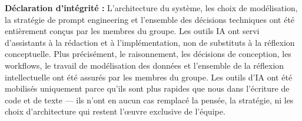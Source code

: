 \documentclass[12pt, a4paper, oneside]{report}
\begin{document}
\begin{successbox}
  \textbf{Déclaration d'intégrité :} L'architecture du système, les choix de
  modélisation, la stratégie de prompt engineering et l'ensemble des décisions
  techniques ont été entièrement conçus par les membres du groupe. Les outils IA
  ont servi d'assistants à la rédaction et à l'implémentation, non de substituts
  à la réflexion conceptuelle. Plus précisément, le raisonnement, les décisions
  de conception, les workflows, le travail de modélisation des données et
  l'ensemble de la réflexion intellectuelle ont été assurés par les membres du
  groupe. Les outils d'IA ont été mobilisés uniquement parce qu'ils sont plus
  rapides que nous dans l'écriture de code et de texte — ils n'ont en aucun cas
  remplacé la pensée, la stratégie, ni les choix d'architecture qui restent
  l'œuvre exclusive de l'équipe.
\end{successbox}
\end{document}
